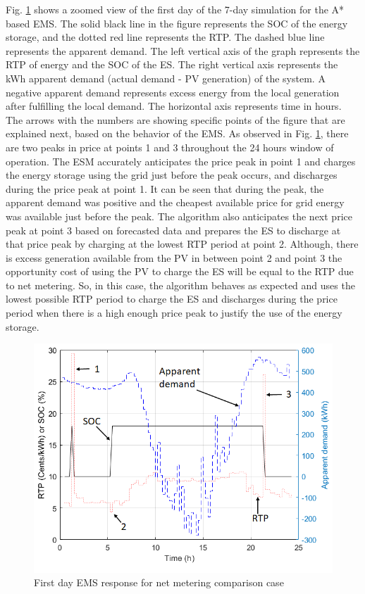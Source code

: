 Fig. \ref{fig:SBMPO_COMP_1_day} shows a zoomed view of the first day of the 7-day simulation for the A* based EMS. The solid black line in the figure represents the SOC of the energy storage, and the dotted red line represents the RTP. The dashed blue line represents the apparent demand. The left vertical axis of the graph represents the RTP of energy and the SOC of the ES. The right vertical axis represents the kWh apparent demand (actual demand - PV generation) of the system. A negative apparent demand represents excess energy from the local generation after fulfilling the local demand. The horizontal axis represents time in hours. The arrows with the numbers are showing specific points of the figure that are explained next, based on the behavior of the EMS. As observed in Fig. \ref{fig:SBMPO_COMP_1_day}, there are two peaks in price at points 1 and 3 throughout the 24 hours window of operation. The ESM accurately anticipates the price peak in point 1 and charges the energy storage using the grid just before the peak occurs, and discharges during the price peak at point 1. It can be seen that during the peak, the apparent demand was positive and the cheapest available price for grid energy was available just before the peak. The algorithm also anticipates the next price peak at point 3 based on forecasted data and prepares the ES to discharge at that price peak by charging at the lowest RTP period at point 2. Although, there is excess generation available from the PV in between point 2 and point 3 the opportunity cost of using the PV to charge the ES will be equal to the RTP due to net metering. So, in this case, the algorithm behaves as expected and uses the lowest possible RTP period to charge the ES and discharges during the price period when there is a high enough price peak to justify the use of the energy storage.
\begin{figure}[!ht]
    \centering
    \includegraphics[width = 0.7\linewidth]{figs/SBMPO_COMP_1_day.png}
    \caption{First day EMS response for net metering comparison case}
    \label{fig:SBMPO_COMP_1_day}
\end{figure}
